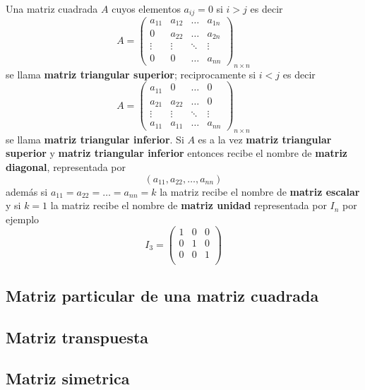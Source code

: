 \documentclass[
  11pt,
]{krantz}
\theoremstyle{definition}
\theoremstyle{definition}
\theoremstyle{definition}
\theoremstyle{definition}
\theoremstyle{remark}
\begin{document}
Una matriz cuadrada \(A\) cuyos elementos \(a_{ij}=0\) si \(i>j\) es decir \[A=\begin{pmatrix}
a_{11}&a_{12}&\ldots&a_{1n}\\
0&a_{22}&\ldots&a_{2n}\\
\vdots & \vdots & \ddots &\vdots \\
0&0&\ldots&a_{nn}
\end{pmatrix}_{n\times n}\] se llama \textbf{matriz triangular superior}; reciprocamente si \(i<j\) es decir \[A=\begin{pmatrix}
a_{11}&0&\ldots&0\\
a_{21}&a_{22}&\ldots&0\\
\vdots & \vdots & \ddots &\vdots \\
a_{11}&a_{11}&\ldots&a_{nn}
\end{pmatrix}_{n\times n}\] se llama \textbf{matriz triangular inferior}. Si \(A\) es a la vez \textbf{matriz triangular superior} y \textbf{matriz triangular inferior} entonces recibe el nombre de \textbf{matriz diagonal}, representada por
\[
\left(a_{11}, a_{22}, \ldots, a_{nn}\right)
\]
además si \(a_{11}= a_{22}= \ldots = a_{nn}=k\) la matriz recibe el nombre de \textbf{matriz escalar} y si \(k=1\) la matriz recibe el nombre de \textbf{matriz unidad} representada por \(I_n\) por ejemplo
\[I_3=\begin{pmatrix}
1  & 0 & 0 \\
0  & 1 & 0 \\
0  & 0 & 1 \\
\end{pmatrix}
\]

\hypertarget{matriz-particular-de-una-matriz-cuadrada}{%
\subsection{Matriz particular de una matriz cuadrada}\label{matriz-particular-de-una-matriz-cuadrada}}

\hypertarget{matriz-transpuesta}{%
\subsection{Matriz transpuesta}\label{matriz-transpuesta}}

\hypertarget{matriz-simetrica}{%
\subsection{Matriz simetrica}\label{matriz-simetrica}}
\end{document}
